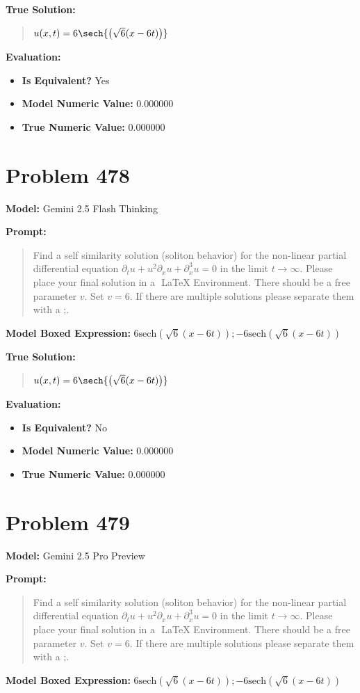 \documentclass{article}
\begin{document}
\textbf{True Solution:}
\begin{quote}
$u(x,t) = 6 \sech{\left( \sqrt{6} (x - 6t) \right)}$
\end{quote}

\textbf{Evaluation:}
\begin{itemize}
\item \textbf{Is Equivalent?} Yes
\item \textbf{Model Numeric Value:} 0.000000
\item \textbf{True Numeric Value:} 0.000000
\end{itemize}
\vspace{1cm}
\section*{Problem 478}
\textbf{Model:} Gemini 2.5 Flash Thinking

\textbf{Prompt:}
\begin{quote}
Find a self similarity solution (soliton behavior) for the non-linear partial differential equation $ \partial_t u + u^2 \partial_x u + \partial_x^3 u = 0 $ in the limit $t\to\infty$. Please place your final solution in a $\boxed{}$ LaTeX Environment. There should be a free parameter $v$. Set $v=6$. If there are multiple solutions please separate them with a ;.
\end{quote}
\textbf{Model Boxed Expression:} $6 \text{sech}(\sqrt{6}(x - 6t)) ; -6 \text{sech}(\sqrt{6}(x - 6t))$

\textbf{True Solution:}
\begin{quote}
$u(x,t) = 6 \sech{\left( \sqrt{6} (x - 6t) \right)}$
\end{quote}

\textbf{Evaluation:}
\begin{itemize}
\item \textbf{Is Equivalent?} No
\item \textbf{Model Numeric Value:} 0.000000
\item \textbf{True Numeric Value:} 0.000000
\end{itemize}
\vspace{1cm}
\section*{Problem 479}
\textbf{Model:} Gemini 2.5 Pro Preview

\textbf{Prompt:}
\begin{quote}
Find a self similarity solution (soliton behavior) for the non-linear partial differential equation $ \partial_t u + u^2 \partial_x u + \partial_x^3 u = 0 $ in the limit $t\to\infty$. Please place your final solution in a $\boxed{}$ LaTeX Environment. There should be a free parameter $v$. Set $v=6$. If there are multiple solutions please separate them with a ;.
\end{quote}
\textbf{Model Boxed Expression:} $6 \text{sech}(\sqrt{6}(x-6t)) ; -6 \text{sech}(\sqrt{6}(x-6t))$
\end{document}
